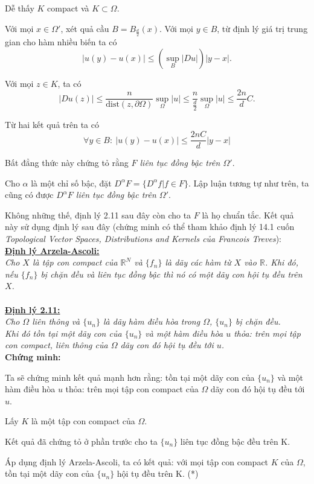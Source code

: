Dễ thấy $K$ compact và $K\subset\Omega$.

Với mọi $x\in\Omega'$, xét quả cầu $B=B_{\frac{d}{2}}(x)$. Với mọi $y\in B$, từ định lý giá trị trung gian cho hàm nhiều biến ta có
\[|u(y)-u(x)|\leq (\sup_{B} |Du|)|y-x|.\]

Với mọi $z\in K$, ta có
\[|Du(z)|\leq \frac{n}{\mbox{dist}(z,\partial\Omega)} \sup_{\Omega}|u|\leq \frac{n}{\frac{d}{2}} \sup_{\Omega}|u|\leq \frac{2n}{d} C.\]

Từ hai kết quả trên ta có
\[\forall y\in B:\ |u(y)-u(x)|\leq \frac{2nC}{d}|y-x|\]

Bất đẳng thức này chứng tỏ rằng \textit{$F$ liên tục đồng bậc trên $\Omega'$}.

Cho $\alpha$ là một chỉ số bậc, đặt $D^{\alpha}F=\{D^{\alpha}f|f\in F\}$. Lập luận tương tự như trên, ta cũng có được \textit{$D^{\alpha}F$ liên tục đồng bậc trên $\Omega'$}.

Không những thế, định lý 2.11 sau đây còn cho ta $F$ là họ chuẩn tắc. Kết quả này sử dụng định lý sau đây (chứng minh có thể tham khảo định lý 14.1 cuốn \textit{Topological Vector Spaces, Distributions and Kernels của Francois Treves}):
\\
\textbf{\underline{Định lý Arzela-Ascoli:}}
\\
\textit{Cho $ X $ là tập con compact của $ \mathbb{R}^{N} $ và $ \{ f_{n} \}$ là dãy các hàm từ $X$ vào $\mathbb{R}$. Khi đó, nếu $ \{ f_{n} \}$ bị chặn đều và liên tục đồng bậc thì nó có một dãy con hội tụ đều trên $X$.}
\\
\\
\textbf{\underline{Định lý 2.11:}}
\\
\textit{Cho $\Omega$ liên thông và $ \{ u_{n}\} $ là dãy hàm điều hòa trong $\Omega$, $ \{ u_{n}\} $ bị chặn đều.
\\
Khi đó tồn tại một dãy con của $ \{ u_{n}\} $ và một hàm điều hòa $u$ thỏa: trên mọi tập con compact, liên thông của $\Omega$ dãy con đó hội tụ đều tới $u$.}
\\
\textbf{Chứng minh:}

Ta sẽ chứng minh kết quả mạnh hơn rằng: tồn tại một dãy con của $ \{ u_{n}\} $ và một hàm điều hòa $u$ thỏa: trên mọi tập con compact của $\Omega$ dãy con đó hội tụ đều tới $u$.

Lấy $ K $ là một tập con compact của $ \Omega $.

Kết quả đã chứng tỏ ở phần trước cho ta $\lbrace u_{n}\rbrace $ liên tục đồng bậc đều trên K.

Áp dụng định lý Arzela-Ascoli, ta có kết quả: với mọi tập con compact $K$ của $\Omega$, tồn tại một dãy con của $ \{ u_{n}\} $ hội tụ đều trên K. (*)

